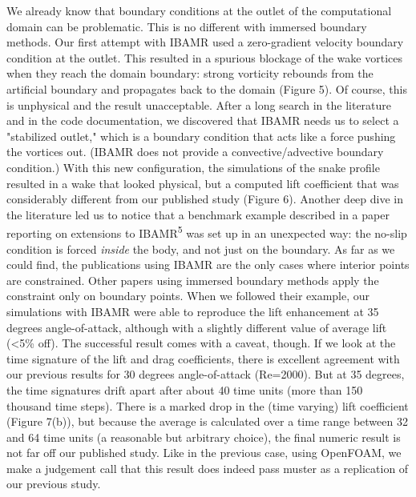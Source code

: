 \documentclass[9pt,twocolumn,twoside]{article}
\newlength{\up}
\begin{document}
We already know that boundary conditions at the outlet of the computational domain can be problematic. This is no different with immersed boundary methods. 
Our first attempt with IBAMR used a zero-gradient velocity boundary condition at the outlet. 
This resulted in a spurious blockage of the wake vortices when they reach the domain boundary: strong vorticity rebounds from the artificial boundary and propagates back to the domain (Figure 5). 
Of course, this is unphysical and the result unacceptable. 
After a long search in the literature and in the code documentation, we discovered that IBAMR needs us to select a "stabilized outlet," which is a boundary condition that acts like a force pushing the vortices out. 
(IBAMR does not provide a convective/advective boundary condition.) 
With this new configuration, the simulations of the snake profile resulted in a wake that looked physical, but a computed lift coefficient that was considerably different from our published study (Figure 6). 
Another deep dive in the literature led us to notice that a benchmark example described in a paper reporting  on extensions to IBAMR\textsuperscript{5} was set up in an unexpected way: 
the no-slip condition is forced \textit{inside} the body, and not just on the boundary. 
As far as we could find, the publications using IBAMR are the only cases where interior points are constrained. 
Other papers using immersed boundary methods apply the constraint only on boundary points.
When we followed their example, our simulations with IBAMR were able to reproduce the lift enhancement at 35 degrees angle-of-attack, although with a slightly different value of average lift (<5\% off). 
The successful result comes with a caveat, though. 
If we look at the time signature of the lift and drag coefficients, there is excellent agreement with our previous results for 30 degrees angle-of-attack (Re=2000). 
But at 35 degrees, the time signatures drift apart after about 40 time units (more than 150 thousand time steps). 
There is a marked drop in the (time varying) lift coefficient (Figure 7(b)), but because the average is calculated over a time range between 32 and 64 time units (a reasonable but arbitrary choice), the final numeric result is not far off our published study. 
Like in the previous case, using OpenFOAM, we make a judgement call that this result does indeed pass muster as a replication of our previous study. 
 
\end{document}
